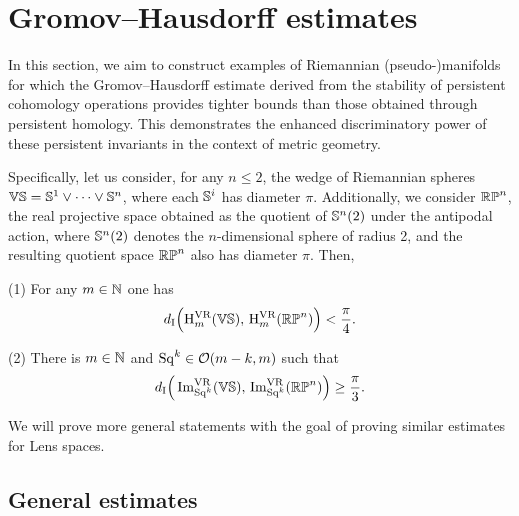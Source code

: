 
\section{Gromov--Hausdorff estimates}\label{prop:db estimate}

In this section, we aim to construct examples of Riemannian (pseudo-)manifolds for which the Gromov--Hausdorff estimate derived from the stability of persistent cohomology operations provides tighter bounds than those obtained through persistent homology.
This demonstrates the enhanced discriminatory power of these persistent invariants in the context of metric geometry.

Specifically, let us consider, for any \(n \leq 2\), the wedge of Riemannian spheres \(\mathbb{V}\mathbb{S} = \mathbb{S}^1 \vee \dots \vee \mathbb{S}^n\), where each \(\mathbb{S}^i\) has diameter \(\pi\).
Additionally, we consider \(\mathbb{RP}^n\), the real projective space obtained as the quotient of \(\mathbb{S}^n(2)\) under the antipodal action, where \(\mathbb{S}^n(2)\) denotes the \(n\)-dimensional sphere of radius 2, and the resulting quotient space \(\mathbb{RP}^n\) also has diameter \(\pi\).
Then,

\medskip (1) For any \(m \in \mathbb{N}\) one has
\[
d_{\mathrm{I}}\Big(\mathrm{H}^{\mathrm{VR}}_m(\mathbb{V}\mathbb{S}),\, \mathrm{H}^{\mathrm{VR}}_m(\mathbb{RP}^n)\Big) < \frac{\pi}{4}.
\]

(2) There is \(m \in \mathbb{N}\) and \(\operatorname{Sq}^k \in \mathcal{O}(m-k, m)\) such that
\[
d_{\mathrm{I}}\Big(\operatorname{Im}_{\operatorname{Sq}^k}^{\mathrm{VR}}(\mathbb{V}\mathbb{S}),\, \operatorname{Im}_{\operatorname{Sq}^k}^{\mathrm{VR}}(\mathbb{RP}^n)\Big) \geq \frac{\pi}{3}.
\]

We will prove more general statements with the goal of proving similar estimates for Lens spaces.


\subsection{General estimates}

